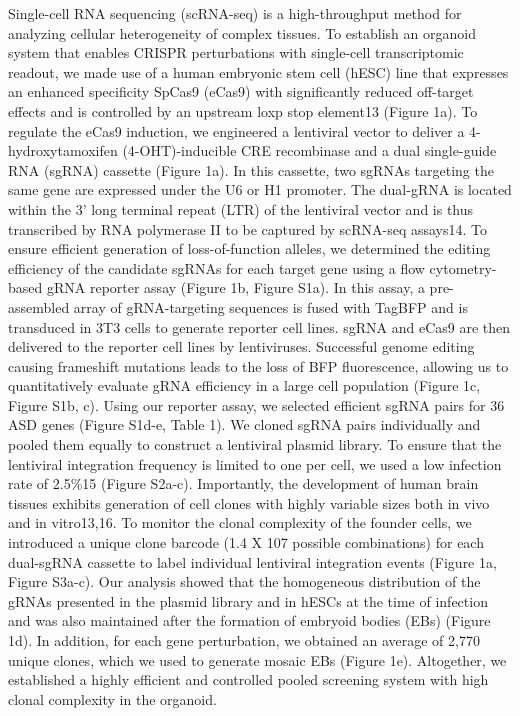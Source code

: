 Single-cell RNA sequencing (scRNA-seq) is a high-throughput method for analyzing cellular heterogeneity of complex tissues. To establish an organoid system that enables CRISPR perturbations with single-cell transcriptomic readout, we made use of a human embryonic stem cell (hESC) line that expresses an enhanced specificity SpCas9 (eCas9) with significantly reduced off-target effects and is controlled by an upstream loxp stop element13 (Figure 1a). To regulate the eCas9 induction, we engineered a lentiviral vector to deliver a 4-hydroxytamoxifen (4-OHT)-inducible CRE recombinase and a dual single-guide RNA (sgRNA) cassette (Figure 1a). In this cassette, two sgRNAs targeting the same gene are expressed under the U6 or H1 promoter. The dual-gRNA is located within the 3' long terminal repeat (LTR) of the lentiviral vector and is thus transcribed by RNA polymerase II to be captured by scRNA-seq assays14. To ensure efficient generation of loss-of-function alleles, we determined the editing efficiency of the candidate sgRNAs for each target gene using a flow cytometry-based gRNA reporter assay (Figure  1b, Figure S1a). In this assay, a pre-assembled array of gRNA-targeting sequences is fused with TagBFP and is transduced in 3T3 cells to generate reporter cell lines. sgRNA and eCas9 are then delivered to the reporter cell lines by lentiviruses. Successful genome editing causing frameshift mutations leads to the loss of BFP fluorescence, allowing us to quantitatively evaluate gRNA efficiency in a large cell population (Figure  1c, Figure S1b, c). Using our reporter assay, we selected efficient sgRNA pairs for 36 ASD genes (Figure S1d-e, Table 1).  
We cloned sgRNA pairs individually and pooled them equally to construct a lentiviral plasmid library. To ensure that the lentiviral integration frequency is limited to one per cell, we used a low infection rate of 2.5\%15 (Figure S2a-c). Importantly, the development of human brain tissues exhibits generation of cell clones with highly variable sizes both in vivo and in vitro13,16. To monitor the clonal complexity of the founder cells, we introduced a unique clone barcode (1.4 X 107 possible combinations) for each dual-sgRNA cassette to label individual lentiviral integration events (Figure  1a, Figure S3a-c). Our analysis showed that the homogeneous distribution of the gRNAs presented in the plasmid library and in hESCs at the time of infection and was also maintained after the formation of embryoid bodies (EBs) (Figure 1d). In addition, for each gene perturbation, we obtained an average of 2,770 unique clones, which we used to generate mosaic EBs (Figure 1e). Altogether, we established a highly efficient and controlled pooled screening system with high clonal complexity in the organoid. 

